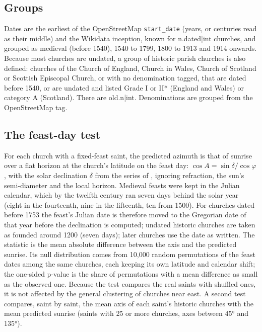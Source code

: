 \documentclass[11pt,a4paper]{article}
\begin{document}
\subsection{Groups}
Dates are the earliest of the OpenStreetMap \texttt{start\_date} (years, or centuries read as their middle) and the Wikidata inception, known for {{n.dated|int}} churches, and grouped as medieval (before 1540), 1540 to 1799, 1800 to 1913 and 1914 onwards. Because most churches are undated, a group of historic parish churches is also defined: churches of the Church of England, Church in Wales, Church of Scotland or Scottish Episcopal Church, or with no denomination tagged, that are dated before 1540, or are undated and listed Grade I or II* (England and Wales) or category A (Scotland). There are {{old.n|int}}. Denominations are grouped from the OpenStreetMap tag.

\subsection{The feast-day test}
For each church with a fixed-feast saint, the predicted azimuth is that of sunrise over a flat horizon at the church's latitude on the feast day: $\cos A = \sin\delta / \cos\varphi$, with the solar declination $\delta$ from the series of \citet{spencer}, ignoring refraction, the sun's semi-diameter and the local horizon. Medieval feasts were kept in the Julian calendar, which by the twelfth century ran seven days behind the solar year (eight in the fourteenth, nine in the fifteenth, ten from 1500). For churches dated before 1753 the feast's Julian date is therefore moved to the Gregorian date of that year before the declination is computed; undated historic churches are taken as founded around 1200 (seven days); later churches use the date as written. The statistic is the mean absolute difference between the axis and the predicted sunrise. Its null distribution comes from 10,000 random permutations of the feast dates among the same churches, each keeping its own latitude and calendar shift; the one-sided p-value is the share of permutations with a mean difference as small as the observed one. Because the test compares the real saints with shuffled ones, it is not affected by the general clustering of churches near east. A second test compares, saint by saint, the mean axis of each saint's historic churches with the mean predicted sunrise (saints with 25 or more churches, axes between 45° and 135°).
\end{document}
